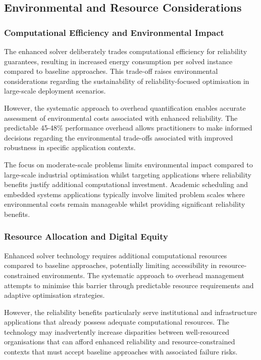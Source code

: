 \subsection{Environmental and Resource Considerations}

\subsubsection{Computational Efficiency and Environmental Impact}

The enhanced solver deliberately trades computational efficiency for reliability guarantees, resulting in increased energy consumption per solved instance compared to baseline approaches. This trade-off raises environmental considerations regarding the sustainability of reliability-focused optimisation in large-scale deployment scenarios.

However, the systematic approach to overhead quantification enables accurate assessment of environmental costs associated with enhanced reliability. The predictable 45-48\% performance overhead allows practitioners to make informed decisions regarding the environmental trade-offs associated with improved robustness in specific application contexts.

The focus on moderate-scale problems limits environmental impact compared to large-scale industrial optimisation whilst targeting applications where reliability benefits justify additional computational investment. Academic scheduling and embedded systems applications typically involve limited problem scales where environmental costs remain manageable whilst providing significant reliability benefits.

\subsubsection{Resource Allocation and Digital Equity}

Enhanced solver technology requires additional computational resources compared to baseline approaches, potentially limiting accessibility in resource-constrained environments. The systematic approach to overhead management attempts to minimise this barrier through predictable resource requirements and adaptive optimisation strategies.

However, the reliability benefits particularly serve institutional and infrastructure applications that already possess adequate computational resources. The technology may inadvertently increase disparities between well-resourced organisations that can afford enhanced reliability and resource-constrained contexts that must accept baseline approaches with associated failure risks.

